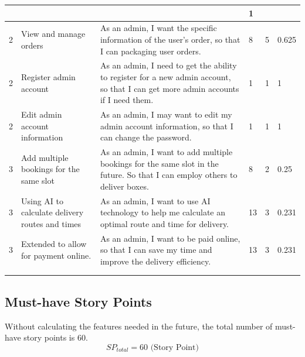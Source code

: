 \documentclass{report}
\begin{document}
\begin{tabularx}{0.95\linewidth}{%
  l
  >{\raggedright\arraybackslash}p{3cm}%
  >{\raggedright\arraybackslash}X%
  p{1cm}p{1cm}p{1cm}
}
& 2
& 2
& 1
\\
\midrule
2
& View and manage orders
& As an admin, I want the specific information of the user's order, so that I can packaging user orders.
& 8
& 5
& 0.625
\\
\midrule
2
& Register admin account
& As an admin, I need to get the ability to register for a new admin account, so that I can get more admin accounts if I need them.
& 1
& 1
& 1
\\
\midrule
2
& Edit admin account information
& As an admin, I may want to edit my admin account information, so that I can change the password.
& 1
& 1
& 1
\\
\midrule
3
& Add multiple bookings for the same slot
& As an admin, I want to add multiple bookings for the same slot in the future. So that I  can employ others to deliver boxes.
& 8
& 2
& 0.25
\\
\midrule
3
& Using AI to calculate delivery routes and times
& As an admin, I want to use AI technology to help me calculate an optimal route and time for delivery.
& 13
& 3
& 0.231
\\
\midrule
3
& Extended to allow for payment online.
& As an admin, I want to be paid online, so that I can save my time and improve the delivery efficiency.
& 13
& 3
& 0.231
\\
\bottomrule
\\
\caption{Product Backlog}  
\label{tab:productBacklog}
\end{tabularx}  

\subsection{Must-have Story Points}
Without calculating the features needed in the future, the total number of must-have story points is 60.
$$
SP_{total} = 60 \text{ (Story Point)}
$$
\end{document}
